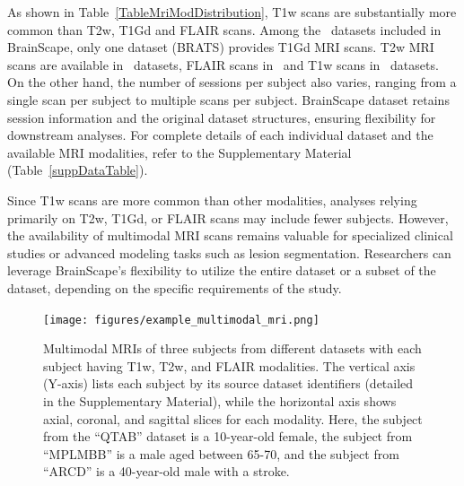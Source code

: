     
As shown in Table~\ref{TableMriModDistribution}, T1w scans are substantially more common than T2w, T1Gd and FLAIR scans.
Among the \NumDatasets\ datasets included in BrainScape, only one dataset (BRATS) provides T1Gd MRI scans. 
T2w MRI scans are available in \NumDatasetsWithTTwoScans\ datasets, 
FLAIR scans in \NumDatasetsWithTFlairScans\, 
and T1w scans in \NumDatasetsWithTToneScans\ datasets.
On the other hand, the number of sessions per subject also varies, 
ranging from a single scan per subject to multiple scans per subject. BrainScape dataset 
retains session information and the original dataset structures, ensuring flexibility 
for downstream analyses. For complete details of each individual dataset and the available
MRI modalities, refer to the Supplementary Material (Table~\ref{suppDataTable}).

Since T1w scans are more common than other modalities, 
analyses relying primarily on T2w, T1Gd, or FLAIR scans may include fewer subjects. 
However, the availability of multimodal MRI scans remains valuable for specialized clinical studies or advanced modeling tasks such as lesion segmentation. 
Researchers can leverage BrainScape's flexibility to utilize the entire dataset or a subset of the dataset, depending on the specific requirements of the study.

\begin{figure}[ht]
    \centering
    \texttt{[image: figures/example\_multimodal\_mri.png]} 
    \caption{
        Multimodal MRIs of three subjects from different datasets with each subject having T1w, T2w, and FLAIR modalities. 
        The vertical axis (Y-axis) lists each subject by its source dataset identifiers (detailed in the Supplementary Material), 
        while the horizontal axis shows axial, coronal, and sagittal slices for each modality. 
        Here, the subject from the ``QTAB'' dataset is a 10-year-old female, 
        the subject from ``MPLMBB'' is a male aged between 65-70, 
        and the subject from ``ARCD'' is a 40-year-old male with a stroke. 
    }
    \label{fig:ExampleMultimodal}
\end{figure}

